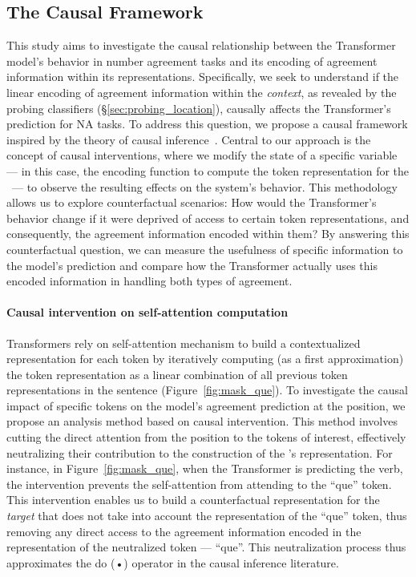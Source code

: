 \subsection{The Causal Framework} \label{sec:causal_framework}
This study aims to investigate the causal relationship between the Transformer model's behavior in number agreement tasks and its encoding of agreement information within its representations. Specifically, we seek to understand if the linear encoding of agreement information within the \emph{context}, as revealed by the probing classifiers (\S\ref{sec:probing_location}), causally affects the Transformer's prediction for NA tasks. To address this question, we propose a causal framework inspired by the theory of causal inference~\citep{pearl2018book}. Central to our approach is the concept of causal interventions, where we modify the state of a specific variable --- in this case, the encoding function to compute the token representation for the \target\ --- to observe the resulting effects on the system's behavior. This methodology allows us to explore counterfactual scenarios: How would the Transformer's behavior change if it were deprived of access to certain token representations, and consequently, the agreement information encoded within them? By answering this counterfactual question, we can measure the usefulness of specific information to the model's prediction and compare how the Transformer actually uses this encoded information in handling both types of agreement. 

\paragraph{Causal intervention on self-attention computation}
Transformers rely on self-attention mechanism to build a contextualized representation for each token by
iteratively computing (as a first
approximation) the token representation as a linear combination of
 all previous token representations in the sentence (Figure~\ref{fig:mask_que}). To investigate the causal impact of specific tokens on the model's agreement prediction at the \target position, we propose an analysis method based on causal intervention. This method involves cutting the direct attention from the \target position to the tokens of interest, effectively neutralizing their contribution to the
construction of the \target's representation.  For instance, in Figure~\ref{fig:mask_que}, when the Transformer is predicting the \target verb, the intervention prevents the self-attention from attending to the ``que'' token. This intervention enables us to build a counterfactual representation
for the \emph{target} that does not take into
account the representation of the ``que'' token, thus removing any direct access to the agreement information
encoded in the representation of the neutralized token --- ``que''. This neutralization process thus approximates the do (•) operator in the causal inference literature.  

